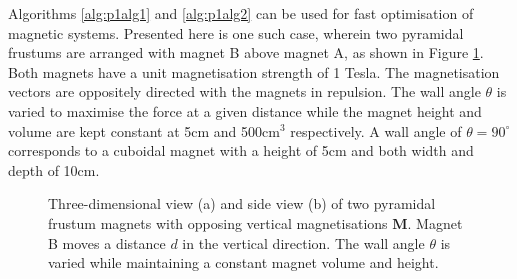 Algorithms \ref{alg:p1alg1} and \ref{alg:p1alg2} can be used for fast optimisation of magnetic systems. Presented here is one such case, wherein two pyramidal frustums are arranged with magnet B above magnet A, as shown in Figure \ref{fig:p1frustumcase}. Both magnets have a unit magnetisation strength of 1 Tesla. The magnetisation vectors are oppositely directed with the magnets in repulsion. The wall angle \(\theta\) is varied to maximise the force at a given distance while the magnet height and volume are kept constant at 5cm and 500cm\(^3\) respectively. A wall angle of \(\theta = 90^\circ\) corresponds to a cuboidal magnet with a height of 5cm and both width and depth of 10cm.
\begin{figure}
	\centering
	
	\caption{Three-dimensional view (a) and side view (b) of two pyramidal frustum magnets with opposing vertical magnetisations \(\mathbf{M}\). Magnet B moves a distance \(d\) in the vertical direction. The wall angle \(\theta\) is varied while maintaining a constant magnet volume and height.}
	\label{fig:p1frustumcase}
\end{figure}

